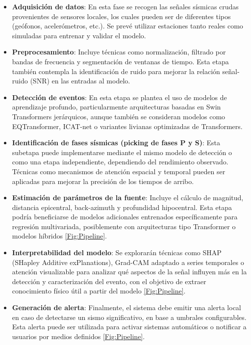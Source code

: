 \begin{itemize}
\item \textbf{Adquisición de datos}: En esta fase se recogen las señales sísmicas crudas provenientes de sensores locales, los cuales pueden ser de diferentes tipos (geófonos, acelerómetros, etc.). Se prevé utilizar estaciones tanto reales como simuladas para entrenar y validar el modelo.

\item \textbf{Preprocesamiento}: Incluye técnicas como normalización, filtrado por bandas de frecuencia y segmentación de ventanas de tiempo. Esta etapa también contempla la identificación de ruido para mejorar la relación señal-ruido (SNR) en las entradas al modelo.

\item \textbf{Detección de eventos}: En esta etapa se plantea el uso de modelos de aprendizaje profundo, particularmente arquitecturas basadas en Swin Transformers jerárquicos, aunque también se consideran modelos como EQTransformer, ICAT-net o variantes livianas optimizadas de Transformers.

\item \textbf{Identificación de fases sísmicas (picking de fases P y S)}: Esta subetapa puede implementarse mediante el mismo modelo de detección o como una etapa independiente, dependiendo del rendimiento observado. Técnicas como mecanismos de atención espacial y temporal pueden ser aplicadas para mejorar la precisión de los tiempos de arribo.

\item \textbf{Estimación de parámetros de la fuente}: Incluye el cálculo de magnitud, distancia epicentral, back-azimuth y profundidad hipocentral. Esta etapa podría beneficiarse de modelos adicionales entrenados específicamente para regresión multivariada, posiblemente con arquitecturas tipo Transformer o modelos híbridos \ref{Fig:Pipeline}.

\item \textbf{Interpretabilidad del modelo}: Se explorarán técnicas como SHAP (SHapley Additive exPlanations), Grad-CAM adaptado a series temporales o atención visualizable para analizar qué aspectos de la señal influyen más en la detección y caracterización del evento, con el objetivo de extraer conocimiento físico útil a partir del modelo \ref{Fig:Pipeline}.

\item \textbf{Generación de alerta}: Finalmente, el sistema debe emitir una alerta local en caso de detectarse un sismo significativo, en base a umbrales configurables. Esta alerta puede ser utilizada para activar sistemas automáticos o notificar a usuarios por medios definidos \ref{Fig:Pipeline}.
\end{itemize}

